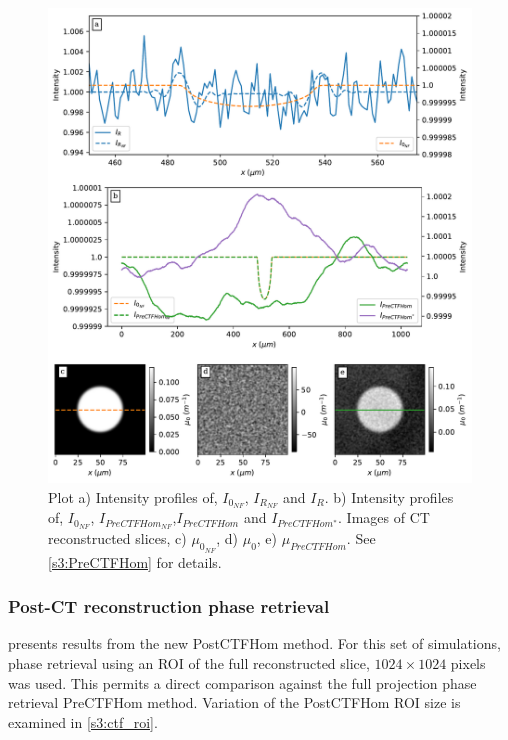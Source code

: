 \documentclass[twocolumn, switch]{article} %
\begin{document}
\begin{figure}[!htbp]
    \centering
        \includegraphics[width=\linewidth]{ctf_paper_results_figure_3.pdf}
        \caption{ Plot a) Intensity profiles of, $I_{{0_{{NF}}}}$, $I_{{R_{{NF}}}}$ and $I_R$. b) Intensity profiles of, $I_{{0_{{NF}}}}$, $I_{PreCTFHom_{NF}}$,$I_{PreCTFHom}$ and $I_{PreCTFHom^{*}}$. Images of CT reconstructed slices, c)  $\mu_{0_{NF}}$, d) $\mu_{0}$, e) $\mu_{PreCTFHom}$. See \cref{s3:PreCTFHom} for details.}
        \label{fig:combined_PreCTFHom}
\end{figure}

\subsubsection{Post-CT reconstruction phase retrieval}\label{s3:PostCTFHom}

 presents results from the new PostCTFHom method. For this set of simulations,  phase retrieval using an ROI of the full reconstructed slice, $1024 \times 1024$ pixels was used. This permits a direct comparison against the full projection phase retrieval PreCTFHom method. Variation of the PostCTFHom ROI size is examined in \cref{s3:ctf_roi}.
\end{document}
